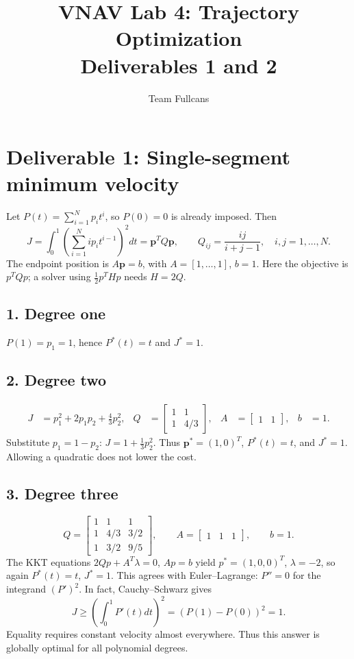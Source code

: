 \documentclass[11pt]{article}
\title{VNAV Lab 4: Trajectory Optimization\\Deliverables 1 and 2}
\author{Team Fullcans}\date{}
\begin{document}
\maketitle
\section*{Deliverable 1: Single-segment minimum velocity}
Let $P(t)=\sum_{i=1}^N p_i t^i$, so $P(0)=0$ is already imposed.
Then
\[
J=\int_0^1\!\left(\sum_{i=1}^N i p_i t^{i-1}\right)^2dt
=\boldsymbol p^T Q\boldsymbol p,\qquad Q_{ij}=\frac{ij}{i+j-1},\quad i,j=1,\ldots,N.
\]
The endpoint position is $A\boldsymbol p=b$, with $A=[1,\ldots,1]$, $b=1$.
Here the objective is $p^TQp$; a solver using $\tfrac12p^THp$ needs $H=2Q$.
\subsection*{1. Degree one}
$P(1)=p_1=1$, hence $P^*(t)=t$ and $J^*=1$.
\subsection*{2. Degree two}
\begin{align*}
J&=p_1^2+2p_1p_2+\tfrac43p_2^2, &
Q&=\begin{bmatrix}1&1\\1&4/3\end{bmatrix}, & A&=\begin{bmatrix}1&1\end{bmatrix}, & b&=1.
\end{align*}
Substitute $p_1=1-p_2$: $J=1+\tfrac13p_2^2$.
Thus $\boldsymbol p^*=(1,0)^T$, $P^*(t)=t$, and $J^*=1$.
Allowing a quadratic does not lower the cost.
\subsection*{3. Degree three}
\[
Q=\begin{bmatrix}1&1&1\\1&4/3&3/2\\1&3/2&9/5\end{bmatrix},\qquad
A=\begin{bmatrix}1&1&1\end{bmatrix},\qquad b=1.
\]
The KKT equations $2Qp+A^T\lambda=0$, $Ap=b$ yield
$p^*=(1,0,0)^T$, $\lambda=-2$, so again $P^*(t)=t$, $J^*=1$.
This agrees with Euler--Lagrange: $P''=0$ for the integrand $(P')^2$.
In fact, Cauchy--Schwarz gives
\[
J\geq\left(\int_0^1 P'(t)dt\right)^2=(P(1)-P(0))^2=1.
\]
Equality requires constant velocity almost everywhere. Thus this answer is globally optimal for all polynomial degrees.
\end{document}
